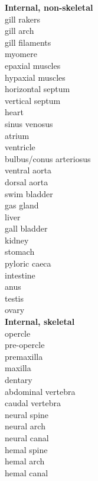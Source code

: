 \documentclass[12pt, hidelinks]{exam}
\begin{document}
\begin{multicols}{3}
\columnbreak\textbf{Internal, non-skeletal} \\
gill rakers \\
gill arch \\
gill filaments \\
myomere \\
epaxial muscles \\
hypaxial muscles \\
horizontal septum \\
vertical septum \\
heart \\
sinus venosus \\
atrium \\
ventricle \\
bulbus/conus arteriosus \\
ventral aorta \\
dorsal aorta \\
swim bladder \\
gas gland \\ %
liver \\
gall bladder \\
kidney \\
stomach \\
pyloric caeca \\
intestine \\
anus \\
testis \\
ovary \\

\columnbreak\textbf{Internal, skeletal} \\
opercle \\
pre-opercle \\
premaxilla \\
maxilla \\
dentary \\
abdominal vertebra \\
caudal vertebra \\
neural spine \\
neural arch \\
neural canal \\
hemal spine \\
hemal arch \\
hemal canal \\
\end{multicols}
\end{document}
